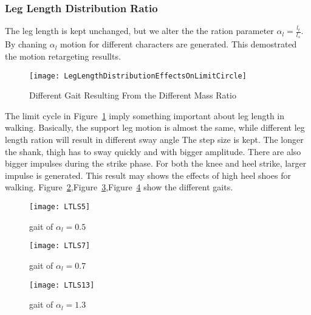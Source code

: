 \subsubsection*{Leg Length Distribution Ratio}
The leg length is kept unchanged, but we alter the the ration parameter $\alpha_l=\frac{l_t}{l_s}$.
By chaning $\alpha_l$ motion for different characters are generated.
This demostrated the motion retargeting resullts.


\begin{figure}[!htbp]
  \begin{center}
      \texttt{[image: LegLengthDistributionEffectsOnLimitCircle]}
    \caption{Different Gait Resulting From the Different Mass Ratio}
    \label{fig:differentlr}
\end{center}
\end{figure}

The limit cycle in Figure~\ref{fig:differentlr} imply something important about leg length in walking.
Basically, the support leg motion is almost the same, while different leg length ration will result in different sway angle
The step size is kept.
The longer the shank, thigh has to sway quickly and with bigger amplitude.
There are also bigger impulses during the strike phase. 
For both the knee and heel strike, larger impulse is generated.
This result may shows the effects of high heel shoes for walking.
Figure~\ref{fig:lr1},Figure~\ref{fig:lr2},Figure~\ref{fig:lr3} show the different gaits.



\begin{figure}[!htbp]
  \begin{center}
      \texttt{[image: LTLS5]}
    \caption{gait of $\alpha_l=0.5$}
    \label{fig:lr1}
\end{center}
\end{figure}

\begin{figure}[!htbp]
  \begin{center}
      \texttt{[image: LTLS7]}
    \caption{gait of $\alpha_l=0.7$}
    \label{fig:lr2}
\end{center}
\end{figure}

\begin{figure}[!htbp]
  \begin{center}
      \texttt{[image: LTLS13]}
    \caption{gait of $\alpha_l=1.3$}
    \label{fig:lr3}
\end{center}
\end{figure}





